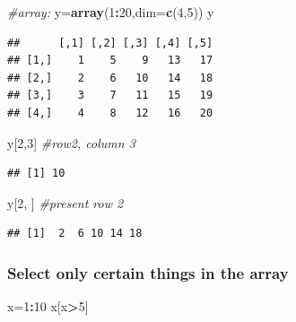 \documentclass[]{article}
\newenvironment{Shaded}{\begin{snugshade}}{\end{snugshade}}
\newcommand{\CommentTok}[1]{\textcolor[rgb]{0.56,0.35,0.01}{\textit{#1}}}
\newcommand{\DataTypeTok}[1]{\textcolor[rgb]{0.13,0.29,0.53}{#1}}
\newcommand{\DecValTok}[1]{\textcolor[rgb]{0.00,0.00,0.81}{#1}}
\newcommand{\KeywordTok}[1]{\textcolor[rgb]{0.13,0.29,0.53}{\textbf{#1}}}
\newcommand{\NormalTok}[1]{#1}
\newcommand{\OperatorTok}[1]{\textcolor[rgb]{0.81,0.36,0.00}{\textbf{#1}}}
\begin{document}
\begin{Shaded}
\begin{Highlighting}[]
\CommentTok{#array:}
\NormalTok{y=}\KeywordTok{array}\NormalTok{(}\DecValTok{1}\OperatorTok{:}\DecValTok{20}\NormalTok{,}\DataTypeTok{dim=}\KeywordTok{c}\NormalTok{(}\DecValTok{4}\NormalTok{,}\DecValTok{5}\NormalTok{))}
\NormalTok{y}
\end{Highlighting}
\end{Shaded}

\begin{verbatim}
##      [,1] [,2] [,3] [,4] [,5]
## [1,]    1    5    9   13   17
## [2,]    2    6   10   14   18
## [3,]    3    7   11   15   19
## [4,]    4    8   12   16   20
\end{verbatim}

\begin{Shaded}
\begin{Highlighting}[]
\NormalTok{y[}\DecValTok{2}\NormalTok{,}\DecValTok{3}\NormalTok{] }\CommentTok{#row2, column 3}
\end{Highlighting}
\end{Shaded}

\begin{verbatim}
## [1] 10
\end{verbatim}

\begin{Shaded}
\begin{Highlighting}[]
\NormalTok{y[}\DecValTok{2}\NormalTok{, ] }\CommentTok{#present row 2}
\end{Highlighting}
\end{Shaded}

\begin{verbatim}
## [1]  2  6 10 14 18
\end{verbatim}

\hypertarget{select-only-certain-things-in-the-array}{%
\subsubsection{Select only certain things in the
array}\label{select-only-certain-things-in-the-array}}

\begin{Shaded}
\begin{Highlighting}[]
\NormalTok{x=}\DecValTok{1}\OperatorTok{:}\DecValTok{10}
\NormalTok{x[x}\OperatorTok{>}\DecValTok{5}\NormalTok{]}
\end{Highlighting}
\end{Shaded}
\end{document}
